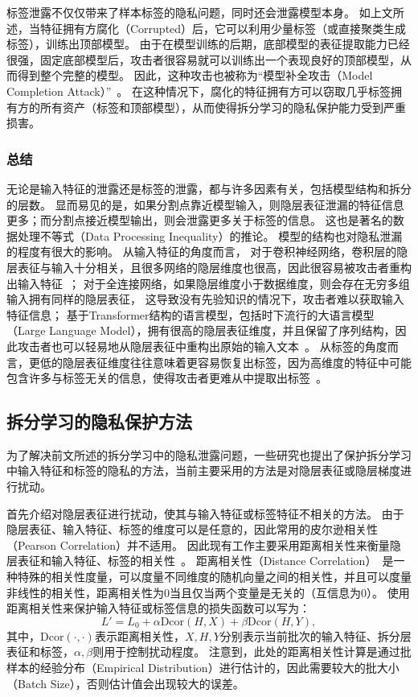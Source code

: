 标签泄露不仅仅带来了样本标签的隐私问题，同时还会泄露模型本身。
%
如上文所述，当特征拥有方腐化（Corrupted）后，它可以利用少量标签（或直接聚类生成标签），训练出顶部模型。
%
由于在模型训练的后期，底部模型的表征提取能力已经很强，固定底部模型后，攻击者很容易就可以训练出一个表现良好的顶部模型，从而得到整个完整的模型。
%
因此，这种攻击也被称为“模型补全攻击（Model Completion Attack）”~\cite{fucong2022label_infer_attack}。
%
在这种情况下，腐化的特征拥有方可以窃取几乎标签拥有方的所有资产（标签和顶部模型），从而使得拆分学习的隐私保护能力受到严重损害。


\subsubsection{总结}
%
无论是输入特征的泄露还是标签的泄露，都与许多因素有关，包括模型结构和拆分的层数。
%
显而易见的是，如果分割点靠近模型输入，则隐层表征泄漏的特征信息更多；而分割点接近模型输出，则会泄露更多关于标签的信息。
%
这也是著名的数据处理不等式（Data Processing Inequality）的推论。
%
模型的结构也对隐私泄漏的程度有很大的影响。
%
从输入特征的角度而言，
%
对于卷积神经网络，卷积层的隐层表征与输入十分相关，且很多网络的隐层维度也很高，因此很容易被攻击者重构出输入特征~\cite{abuadbba2020can_split}；
%
对于全连接网络，如果隐层维度小于数据维度，则会存在无穷多组输入拥有同样的隐层表征，
这导致没有先验知识的情况下，攻击者难以获取输入特征信息；
%
基于Transformer结构的语言模型，包括时下流行的大语言模型（Large Language Model），拥有很高的隐层表征维度，并且保留了序列结构，因此攻击者也可以轻易地从隐层表征中重构出原始的输入文本~\cite{morris2023embedding_almost}。
%
从标签的角度而言，更低的隐层表征维度往往意味着更容易恢复出标签，因为高维度的特征中可能包含许多与标签无关的信息，使得攻击者更难从中提取出标签~\cite{oscarli2022label_defense_marvell,sunjiankai2022forward_embedding_protect}。


\subsection{拆分学习的隐私保护方法}
为了解决前文所述的拆分学习中的隐私泄露问题，一些研究也提出了保护拆分学习中输入特征和标签的隐私的方法，当前主要采用的方法是对隐层表征或隐层梯度进行扰动。

首先介绍对隐层表征进行扰动，使其与输入特征或标签特征不相关的方法。
%
由于隐层表征、输入特征、标签的维度可以是任意的，因此常用的皮尔逊相关性（Pearson Correlation）并不适用。
%
因此现有工作主要采用距离相关性来衡量隐层表征和输入特征、标签的相关性~\cite{vepakomma2020nopeek,sunjiankai2022forward_embedding_protect}。
%
距离相关性（Distance Correlation）~\cite{szekely2007dcor,szekely2009brownian_dcor}是一种特殊的相关性度量，可以度量不同维度的随机向量之间的相关性，并且可以度量非线性的相关性，距离相关性为0当且仅当两个变量是无关的（互信息为0）。
%
使用距离相关性来保护输入特征或标签信息的损失函数可以写为：
\begin{equation}
    L' = L_0 + \alpha \text{Dcor}(H, X) + \beta \text{Dcor}(H, Y),
\end{equation}
其中，$\text{Dcor}(\cdot, \cdot)$表示距离相关性，$X,H,Y$分别表示当前批次的输入特征、拆分层表征和标签，$\alpha,\beta$则用于控制扰动程度。
%
注意到，此处的距离相关性计算是通过批样本的经验分布（Empirical Distribution）进行估计的，因此需要较大的批大小（Batch Size），否则估计值会出现较大的误差。
%

